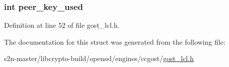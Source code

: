 \subsubsection[{\texorpdfstring{peer\+\_\+key\+\_\+used}{peer_key_used}}]{\setlength{\rightskip}{0pt plus 5cm}int peer\+\_\+key\+\_\+used}\hypertarget{structgost__pmeth__data_a05b0f387cc19262e7e548ba85b6cb651}{}\label{structgost__pmeth__data_a05b0f387cc19262e7e548ba85b6cb651}


Definition at line 52 of file gost\+\_\+lcl.\+h.



The documentation for this struct was generated from the following file\+:\begin{DoxyCompactItemize}
\item 
s2n-\/master/libcrypto-\/build/openssl/engines/ccgost/\hyperlink{gost__lcl_8h}{gost\+\_\+lcl.\+h}\end{DoxyCompactItemize}
